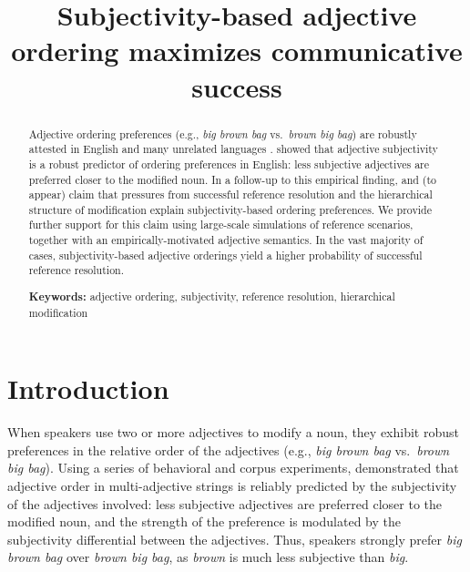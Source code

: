 \documentclass[10pt,a4paper]{article}
\title{Subjectivity-based adjective ordering maximizes communicative success}
\begin{document}
\maketitle

\begin{abstract}
  
Adjective ordering preferences (e.g., \emph{big brown bag} vs.~\emph{brown big bag}) are robustly attested in English and many unrelated languages \cite{dixon1982}.  showed that adjective subjectivity is a robust predictor of ordering preferences in English: less subjective adjectives are preferred closer to the modified noun. In a follow-up to this empirical finding,  and \citeauthor{scontrasetalSPadjectives} (to appear) claim that pressures from successful reference resolution and the hierarchical structure of modification explain subjectivity-based ordering preferences. We provide further support for this claim using large-scale simulations of reference scenarios, together with an empirically-motivated adjective semantics. In the vast majority of cases, subjectivity-based adjective orderings yield a higher probability of successful reference resolution.

\textbf{Keywords:} 
adjective ordering, subjectivity, reference resolution, hierarchical modification

\end{abstract}

\section{Introduction}

When speakers use two or more adjectives to modify a noun, they exhibit robust preferences in the relative order of the adjectives (e.g., \emph{big brown bag} vs.~\emph{brown big bag}). Using a series of behavioral and corpus experiments,  demonstrated that adjective order in multi-adjective strings is reliably predicted by the subjectivity of the adjectives involved: less subjective adjectives are preferred closer to the modified noun, and the strength of the preference is modulated by the subjectivity differential between the adjectives. Thus, speakers strongly prefer \emph{big brown bag} over \emph{brown big bag}, as \emph{brown} is much less subjective than \emph{big}.
\end{document}
